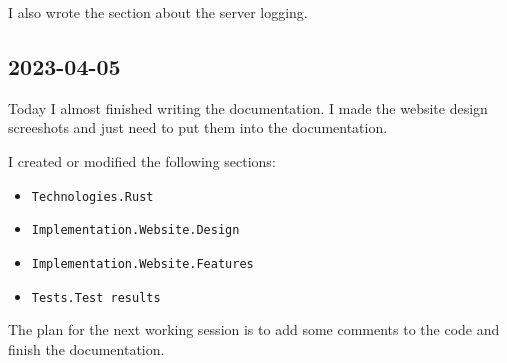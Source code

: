 \documentclass{article}
\begin{document}
I also wrote the section about the server logging.

\subsection{2023-04-05}

Today I almost finished writing the documentation.
I made the website design screeshots and just need to put them
into the documentation.

I created or modified the following sections:
\begin{itemize}
    \item \texttt{Technologies.Rust}
    \item \texttt{Implementation.Website.Design}
    \item \texttt{Implementation.Website.Features}
    \item \texttt{Tests.Test results}
\end{itemize}

The plan for the next working session is to add some comments to the code
and finish the documentation.
\end{document}
